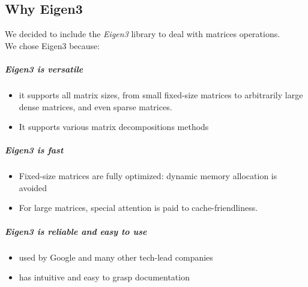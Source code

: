 \documentclass{article}
\begin{document}
\subsection{Why Eigen3}
We decided to include the \textit{Eigen3} library to deal with matrices operations.\\
We chose Eigen3 because:
\subparagraph{Eigen3 is versatile}
\begin{itemize}
    \item it supports all matrix sizes, from small fixed-size matrices to arbitrarily large dense matrices, and even sparse matrices.
    \item It supports various matrix decompositions methods
\end{itemize}
\subparagraph{Eigen3 is fast}
\begin{itemize}
    \item Fixed-size matrices are fully optimized: dynamic memory allocation is avoided
    \item For large matrices, special attention is paid to cache-friendliness.
\end{itemize}
\subparagraph{Eigen3 is reliable and easy to use}
\begin{itemize}
    \item used by Google and many other tech-lead companies
    \item has intuitive and easy to grasp documentation
\end{itemize}
\end{document}
